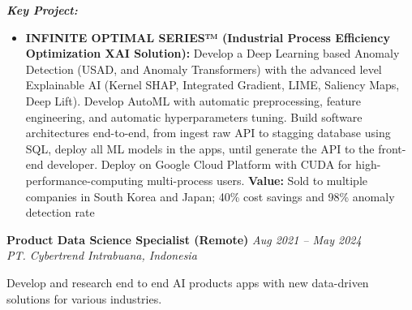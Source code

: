 \documentclass[10pt,a4paper]{article}
\newcommand{\experience}[4]{%
    \noindent\textbf{#1} \hfill \textit{#2}\\
    \textit{#3} \hfill #4\vspace{2pt}
}
\begin{document}
\textit{\textbf{Key Project:}}
\begin{itemize}
    \item \textbf{INFINITE OPTIMAL SERIES™ (Industrial Process Efficiency Optimization XAI Solution):} Develop a Deep Learning based Anomaly Detection (USAD, and Anomaly Transformers) with the advanced level Explainable AI (Kernel SHAP, Integrated Gradient, LIME, Saliency Maps, Deep Lift). Develop AutoML with automatic preprocessing, feature engineering, and automatic hyperparameters tuning. Build software architectures end-to-end, from ingest raw API to stagging database using SQL, deploy all ML models in the apps, until generate the API to the front-end developer. Deploy on Google Cloud Platform with CUDA for high-performance-computing multi-process users. \textcolor{accent}{\textbf{Value:}} Sold to multiple companies in South Korea and Japan; 40\% cost savings and 98\% anomaly detection rate
\end{itemize}

\vspace{4pt}

\experience{Product Data Science Specialist (Remote)}{Aug 2021 -- May 2024}{PT. Cybertrend Intrabuana, Indonesia}{}

Develop and research end to end AI products apps with new data-driven solutions for various industries.
\end{document}

